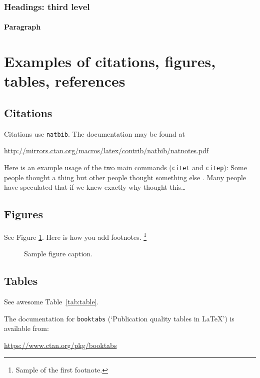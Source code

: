 \documentclass{article}
\begin{document}
\subsubsection{Headings: third level}
\lipsum[6]

\paragraph{Paragraph}
\lipsum[7]



\section{Examples of citations, figures, tables, references}
\label{sec:others}

\subsection{Citations}
Citations use \verb+natbib+. The documentation may be found at
\begin{center}
	\url{http://mirrors.ctan.org/macros/latex/contrib/natbib/natnotes.pdf}
\end{center}

Here is an example usage of the two main commands (\verb+citet+ and \verb+citep+): Some people thought a thing \citep{kour2014real, hadash2018estimate} but other people thought something else \citep{kour2014fast}. Many people have speculated that if we knew exactly why \citet{kour2014fast} thought this\dots

\subsection{Figures}
\lipsum[10]
See Figure \ref{fig:fig1}. Here is how you add footnotes. \footnote{Sample of the first footnote.}
\lipsum[11]

\begin{figure}
	\centering
	\fbox{\rule[-.5cm]{4cm}{4cm} \rule[-.5cm]{4cm}{0cm}}
	\caption{Sample figure caption.}
	\label{fig:fig1}
\end{figure}

\subsection{Tables}
See awesome Table~\ref{tab:table}.

The documentation for \verb+booktabs+ (`Publication quality tables in LaTeX') is available from:
\begin{center}
	\url{https://www.ctan.org/pkg/booktabs}
\end{center}
\end{document}
